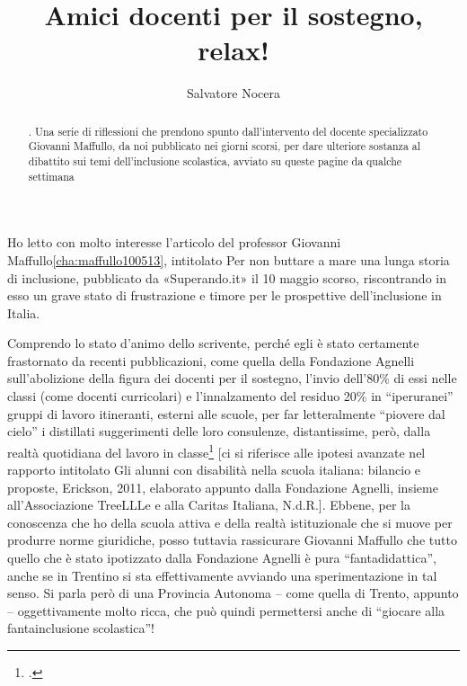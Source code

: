 \author{Salvatore Nocera}
\title{Amici docenti per il sostegno, relax! }
\label{cha:nocera130513}
\begin{abstract}
. Una serie di riflessioni che prendono spunto dall'intervento del docente specializzato Giovanni Maffullo, da noi pubblicato nei giorni scorsi, per dare ulteriore sostanza al dibattito sui temi dell'inclusione scolastica, avviato su queste pagine da qualche settimana
\end{abstract}
\maketitle
Ho letto con molto interesse l'articolo del professor Giovanni Maffullo\ref{cha:maffullo100513}, intitolato Per non buttare a mare una lunga storia di inclusione, pubblicato da «Superando.it» il 10 maggio scorso, riscontrando in esso un grave stato di frustrazione e timore per le prospettive dell'inclusione in Italia.

Comprendo lo stato d'animo dello scrivente, perché egli è stato certamente frastornato da recenti pubblicazioni, come quella della Fondazione Agnelli sull'abolizione della figura dei docenti per il sostegno, l'invio dell'80\% di essi nelle classi (come docenti curricolari) e l'innalzamento del residuo 20\% in “iperuranei” gruppi di lavoro itineranti, esterni alle scuole, per far letteralmente “piovere dal cielo” i distillati suggerimenti delle loro consulenze, distantissime, però, dalla realtà quotidiana del lavoro in classe\footcite{treellle2011alunni} [ci si riferisce alle ipotesi avanzate nel rapporto intitolato Gli alunni con disabilità nella scuola italiana: bilancio e proposte, Erickson, 2011, elaborato appunto dalla Fondazione Agnelli, insieme all'Associazione TreeLLLe e alla Caritas Italiana, N.d.R.].
Ebbene, per la conoscenza che ho della scuola attiva e della realtà  istituzionale che si muove per produrre norme giuridiche, posso tuttavia rassicurare Giovanni Maffullo che tutto quello che è stato ipotizzato dalla Fondazione Agnelli è pura “fantadidattica”, anche se in Trentino si sta effettivamente avviando una sperimentazione in tal senso. Si parla però di una Provincia Autonoma – come quella di Trento, appunto – oggettivamente molto ricca, che può quindi permettersi anche di “giocare alla fantainclusione scolastica”!

